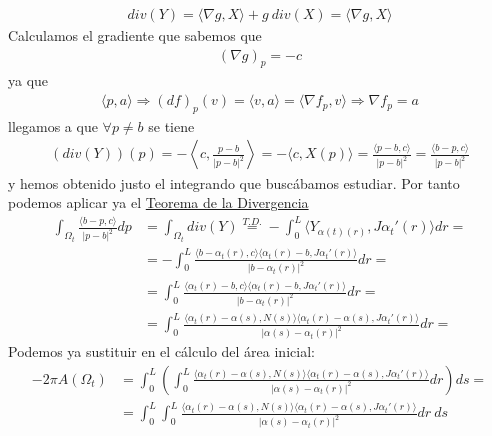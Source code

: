 \begin{observacion}
\begin{enumerate}[start=4]
\begin{gather*}
            div(Y) = \langle \nabla g, X \rangle + g\ div(X) = \langle \nabla g, X \rangle 
        \end{gather*}
        Calculamos el gradiente que sabemos que
        \begin{gather*}
            (\nabla g)_p = -c
        \end{gather*}
        ya que 
        \begin{gather*}
            \langle p,a \rangle \Rightarrow (df)_p(v) = \langle v,a\rangle = \langle \nabla f_p, v\rangle \Rightarrow \nabla f_p = a
        \end{gather*}
        llegamos a que $\forall p \neq b$ se tiene
        \begin{gather*}
            (div(Y))(p) = -\left\langle c, \frac{p-b}{|p-b|^2} \right\rangle = - \langle c, X(p) \rangle = \frac{\langle p-b, c\rangle}{|p-b|^2} = \frac{\langle b-p, c \rangle}{|p-b|^2}
        \end{gather*}
        y hemos obtenido justo el integrando que buscábamos estudiar. Por tanto podemos aplicar ya el \hyperref[teo:divergencia]{Teorema de la Divergencia}
        \begin{align*}
            \int_{\Omega_t} \frac{\langle b-p, c \rangle}{|p-b|^2} dp &= \int_{\Omega_t} div(Y) \overset{T.D.}{=}
            -\int_0^L \langle Y_{\alpha(t)(r)}, J \alpha_t'(r)\rangle dr =\\
            &=
            - \int_0^L \frac{\langle b-\alpha_t(r), c \rangle \langle \alpha_t(r)-b, J \alpha_t'(r)\rangle}{|b-\alpha_t(r)|^2} dr =\\
            &=
            \int_0^L \frac{\langle \alpha_t(r) -b, c \rangle \langle \alpha_t(r)-b, J \alpha_t'(r)\rangle}{|b-\alpha_t(r)|^2} dr =\\
            &=
            \int_0^L \frac{\langle \alpha_t(r) -\alpha(s), N(s) \rangle \langle \alpha_t(r)-\alpha(s), J \alpha_t'(r)\rangle}{|\alpha(s)-\alpha_t(r)|^2} dr =
        \end{align*}
        Podemos ya sustituir en el cálculo del área inicial:
        \begin{align*}
            -2\pi A(\Omega_t) &= 
            \int_0^L \left(\int_0^L \frac{\langle \alpha_t(r) -\alpha(s), N(s) \rangle \langle \alpha_t(r)-\alpha(s), J \alpha_t'(r)\rangle}{|\alpha(s)-\alpha_t(r)|^2} dr \right) ds =\\
            &= 
            \int_0^L \int_0^L \frac{\langle \alpha_t(r) -\alpha(s), N(s) \rangle \langle \alpha_t(r)-\alpha(s), J \alpha_t'(r)\rangle}{|\alpha(s)-\alpha_t(r)|^2} dr\ ds

\end{align*}
\end{enumerate}
\end{observacion}
